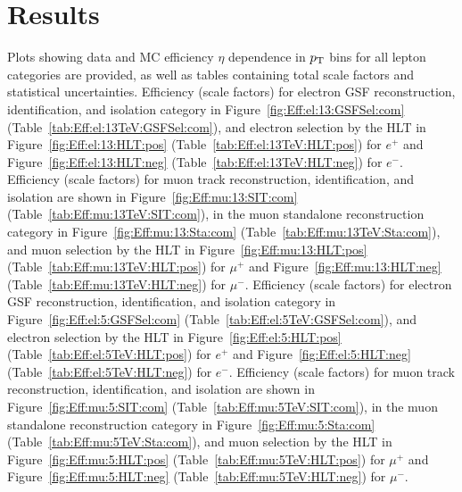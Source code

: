 \section{Results}\label{ch:eff:results}
Plots showing data and MC efficiency $\eta$ dependence in $p_{\mathrm{T}}$ bins for all lepton categories are provided, as well as tables containing total scale factors and statistical uncertainties. Efficiency (scale factors) for \serah electron GSF reconstruction, identification, and isolation category in Figure~\ref{fig:Eff:el:13:GSFSel:com} (Table~\ref{tab:Eff:el:13TeV:GSFSel:com}), and electron selection by the HLT in Figure~\ref{fig:Eff:el:13:HLT:pos} (Table~\ref{tab:Eff:el:13TeV:HLT:pos}) for $e^+$ and Figure~\ref{fig:Eff:el:13:HLT:neg} (Table~\ref{tab:Eff:el:13TeV:HLT:neg}) for $e^-$.  Efficiency (scale factors) for \serah muon track reconstruction, identification, and isolation are shown in Figure~\ref{fig:Eff:mu:13:SIT:com} (Table~\ref{tab:Eff:mu:13TeV:SIT:com}), in the muon standalone reconstruction category in Figure~\ref{fig:Eff:mu:13:Sta:com} (Table~\ref{tab:Eff:mu:13TeV:Sta:com}), and muon selection by the HLT in Figure~\ref{fig:Eff:mu:13:HLT:pos} (Table~\ref{tab:Eff:mu:13TeV:HLT:pos}) for $\mu^+$ and Figure~\ref{fig:Eff:mu:13:HLT:neg} (Table~\ref{tab:Eff:mu:13TeV:HLT:neg}) for $\mu^-$.
 Efficiency (scale factors) for \serag electron GSF reconstruction, identification, and isolation category in Figure~\ref{fig:Eff:el:5:GSFSel:com} (Table~\ref{tab:Eff:el:5TeV:GSFSel:com}), and electron selection by the HLT in Figure~\ref{fig:Eff:el:5:HLT:pos} (Table~\ref{tab:Eff:el:5TeV:HLT:pos}) for $e^+$ and Figure~\ref{fig:Eff:el:5:HLT:neg} (Table~\ref{tab:Eff:el:5TeV:HLT:neg}) for $e^-$.  Efficiency (scale factors) for \serag muon track reconstruction, identification, and isolation are shown in Figure~\ref{fig:Eff:mu:5:SIT:com} (Table~\ref{tab:Eff:mu:5TeV:SIT:com}), in the muon standalone reconstruction category in Figure~\ref{fig:Eff:mu:5:Sta:com} (Table~\ref{tab:Eff:mu:5TeV:Sta:com}), and muon selection by the HLT in Figure~\ref{fig:Eff:mu:5:HLT:pos} (Table~\ref{tab:Eff:mu:5TeV:HLT:pos}) for $\mu^+$ and Figure~\ref{fig:Eff:mu:5:HLT:neg} (Table~\ref{tab:Eff:mu:5TeV:HLT:neg}) for $\mu^-$.





